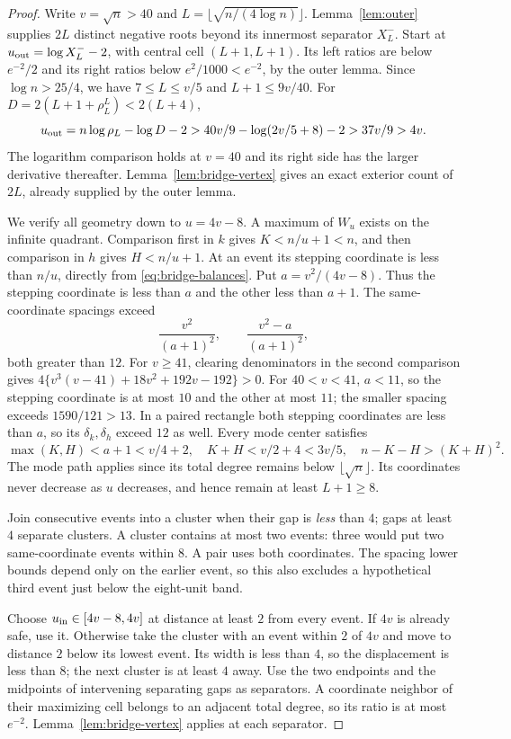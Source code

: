 \begin{proof}
Write $v=\sqrt n>40$ and $L=\lfloor\sqrt{n/(4\log n)}\rfloor$.
Lemma~\ref{lem:outer} supplies $2L$ distinct negative roots beyond
its innermost separator $X_L^-$.
Start at $u_{\rm out}=\log X_L^- -2$, with central cell $(L+1,L+1)$.
Its left ratios are below $e^{-2}/2$ and its right ratios below
$e^2/1000<e^{-2}$, by the outer lemma.
Since $\log n>25/4$, we have $7\le L\le v/5$ and $L+1\le9v/40$.
For $D=2(L+1+\rho_L^L)<2(L+4)$,
\[
 u_{\rm out}=n\log\rho_L-\log D-2
 >40v/9-\log(2v/5+8)-2>37v/9>4v.
\]
The logarithm comparison holds at $v=40$ and its right side has the
larger derivative thereafter. Lemma~\ref{lem:bridge-vertex} gives an
exact exterior count of $2L$, already supplied by the outer lemma.

We verify all geometry down to $u=4v-8$. A maximum of $W_u$ exists
on the infinite quadrant. Comparison first in $k$ gives $K<n/u+1<n$,
and then comparison in $h$ gives $H<n/u+1$.
At an event its stepping coordinate is less than $n/u$, directly
from \eqref{eq:bridge-balances}. Put $a=v^2/(4v-8)$.
Thus the stepping coordinate is less than $a$ and the other less
than $a+1$. The same-coordinate spacings exceed
\[
 \frac{v^2}{(a+1)^2},\qquad \frac{v^2-a}{(a+1)^2},
\]
both greater than $12$. For $v\ge41$, clearing denominators in the
second comparison gives
$4\{v^3(v-41)+18v^2+192v-192\}>0$.
For $40<v<41$, $a<11$, so the stepping coordinate is at most $10$
and the other at most $11$; the smaller spacing exceeds $1590/121>13$.
In a paired rectangle both stepping coordinates are less than $a$,
so its $\delta_k,\delta_h$ exceed $12$ as well.
Every mode center satisfies
\[
 \max(K,H)<a+1<v/4+2,\quad
 K+H<v/2+4<3v/5,\quad n-K-H>(K+H)^2.
\]
The mode path applies since its total degree remains below
$\lfloor\sqrt n\rfloor$. Its coordinates never decrease as $u$
decreases, and hence remain at least $L+1\ge8$.

Join consecutive events into a cluster when their gap is \emph{less}
than $4$; gaps at least $4$ separate clusters.
A cluster contains at most two events: three would put two
same-coordinate events within $8$. A pair uses both coordinates.
The spacing lower bounds depend only on the earlier event, so this
also excludes a hypothetical third event just below the eight-unit band.

Choose $u_{\rm in}\in[4v-8,4v]$ at distance at least $2$ from every
event. If $4v$ is already safe, use it. Otherwise take the cluster
with an event within $2$ of $4v$ and move to distance $2$ below its
lowest event. Its width is less than $4$, so the displacement is
less than $8$; the next cluster is at least $4$ away.
Use the two endpoints and the midpoints of intervening separating
gaps as separators. A coordinate neighbor of their maximizing cell
belongs to an adjacent total degree, so its ratio is at most $e^{-2}$.
Lemma~\ref{lem:bridge-vertex} applies at each separator.


\end{proof}
